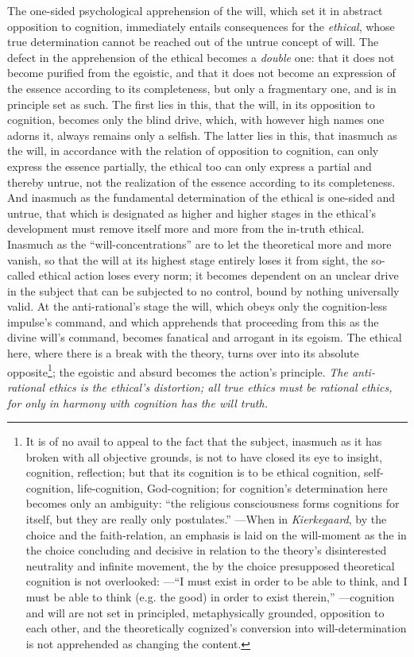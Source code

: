\documentclass[12pt,a4paper]{book}
\begin{document}
The one-sided psychological apprehension of the will, which set it in abstract opposition to
cognition, immediately entails consequences for the \emph{ethical}, whose true determination cannot be
reached out of the untrue concept of will. The defect in the apprehension of the ethical becomes
a \emph{double} one: that it does not become purified from the egoistic, and that it does not
become an expression of the essence according to its completeness, but only a fragmentary one,
and is in principle set as such. The first lies in this, that the will, in its opposition to
cognition, becomes only the blind drive, which, with however high names one adorns it, always
remains only a selfish. The latter lies in this, that inasmuch as the will, in accordance with
the relation of opposition to cognition, can only express the essence partially, the ethical too
can only express a partial and thereby untrue, not the realization of the essence according to
its completeness. And inasmuch as the fundamental determination of the ethical is one-sided and
untrue, that which is designated as higher and higher stages in the ethical's development must
remove itself more and more from the in-truth ethical. Inasmuch as the ``will-concentrations''
are to let the theoretical more and more vanish, so that the will at its highest stage entirely
loses it from sight, the so-called ethical action loses every norm; it becomes dependent on an
unclear drive in the subject that can be subjected to no control, bound by nothing universally
valid. At the anti-rational's stage the will, which obeys only the cognition-less impulse's
command, and which apprehends that proceeding from this as the divine will's command, becomes
fanatical and arrogant in its egoism. The ethical here, where there is a break with the theory,
turns over into its absolute opposite\footnote{It is of no avail to appeal to the fact that the
subject, inasmuch as it has broken with all objective grounds, is not to have closed its eye to
insight, cognition, reflection; but that its cognition is to be ethical cognition, self-cognition,
life-cognition, God-cognition; for cognition's determination here becomes only an ambiguity: ``the
religious consciousness forms cognitions for itself, but they are really only postulates.'' ---When
in \emph{Kierkegaard}, by the choice and the faith-relation, an emphasis is laid on the will-moment as the
in the choice concluding and decisive in relation to the theory's disinterested neutrality and
infinite movement, the by the choice presupposed theoretical cognition is not overlooked: ---``I
must exist in order to be able to think, and I must be able to think (e.g. the good) in order to
exist therein,'' ---cognition and will are not set in principled, metaphysically grounded, opposition
to each other, and the theoretically cognized's conversion into will-determination is not apprehended
as changing the content.}; the egoistic and absurd becomes the action's principle. \emph{The
anti-rational ethics is the ethical's distortion; all true ethics must be rational ethics, for only
in harmony with cognition has the will truth.}
\end{document}
